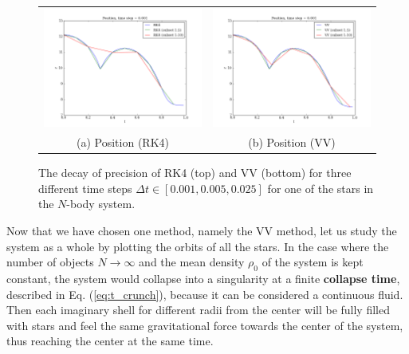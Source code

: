 \documentclass{article}
\begin{document}
\begin{multicols}{2}
\begin{figure}
\begin{center}
\begin{tabular}{cc}
  	\includegraphics[width=90mm]{Images/comparison_N_RK4_position.png}
	& \includegraphics[width=90mm]{Images/comparison_N_VV_position.png} \\
	(a) Position (RK4)				& (b) Position (VV)  \\[6pt]
\end{tabular}
\caption{The decay of precision of RK4 (top) and VV (bottom) for three different time steps $\Delta t \in [0.001, 0.005, 0.025]$ for one of the stars in the $N$-body system.}\label{fig:N_body_timestep}
\end{center}
\end{figure}

\noindent Now that we have chosen one method, namely the VV method, let us study the system as a whole by plotting the orbits of all the stars. In the case where the number of objects $N \rightarrow \infty$ and the mean density $\rho_0$ of the system is kept constant, the system would collapse into a singularity at a finite \textbf{collapse time}, described in Eq. (\ref{eq:t_crunch}), because it can be considered a continuous fluid. Then each imaginary shell for different radii from the center will be fully filled with stars and feel the same gravitational force towards the center of the system, thus reaching the center at the same time. 


\end{multicols}
\end{document}
